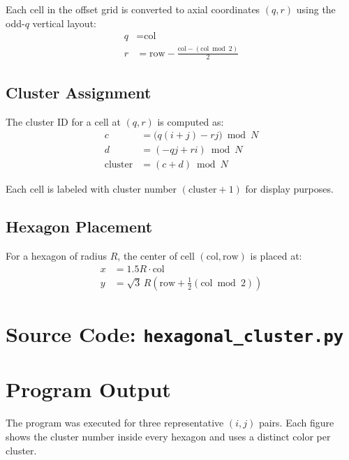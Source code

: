 \documentclass[12pt,a4paper]{report}
\begin{document}
Each cell in the offset grid is converted to axial coordinates $(q, r)$ using the odd-$q$ vertical layout:
\begin{align}
    q &= \text{col} \\
    r &= \text{row} - \frac{\text{col} - (\text{col} \bmod 2)}{2}
\end{align}

\subsection{Cluster Assignment}

The cluster ID for a cell at $(q, r)$ is computed as:
\begin{align}
    c &= \big(q(i+j) - rj\big) \bmod N \\
    d &= (-qj + ri) \bmod N \\
    \text{cluster} &= (c + d) \bmod N
\end{align}

Each cell is labeled with cluster number $(\text{cluster} + 1)$ for display purposes.

\subsection{Hexagon Placement}

For a hexagon of radius $R$, the center of cell $(\text{col}, \text{row})$ is placed at:
\begin{align}
    x &= 1.5 R \cdot \text{col} \\
    y &= \sqrt{3}\, R \left(\text{row} + \tfrac{1}{2}(\text{col} \bmod 2)\right)
\end{align}

\section{Source Code: \texttt{hexagonal\_cluster.py}}



\section{Program Output}

The program was executed for three representative $(i, j)$ pairs. Each figure shows the cluster number inside every hexagon and uses a distinct color per cluster.
\end{document}
